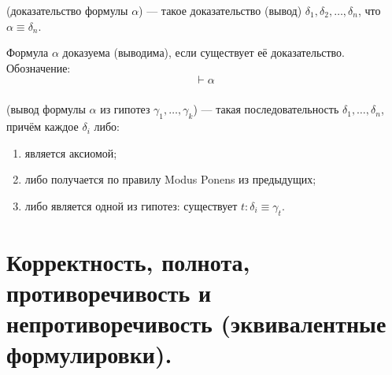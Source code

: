 \documentclass[10pt,a4paper,oneside]{article}
\begin{document}
(доказательство формулы $\alpha$)
--- такое доказательство (вывод) $\delta_1, \delta_2, \dots, \delta_n$,
что $\alpha\equiv\delta_n$.

Формула $\alpha$ доказуема (выводима), если существует её доказательство. Обозначение:
$$\vdash \alpha$$

\subsubsection{}
(вывод формулы $\alpha$ из гипотез $\gamma_1,\dots,\gamma_k$)
    --- такая последовательность
    $\delta_1,\dots,\delta_n$, причём каждое $\delta_i$ либо:
    \begin{enumerate}
    \item является аксиомой;
    \item либо получается по правилу Modus Ponens из предыдущих;
    \item либо является одной из гипотез: существует $t: \delta_i \equiv \gamma_t$.
    \end{enumerate}


\section{Корректность, полнота, противоречивость и непротиворечивость (эквивалентные формулировки).}
\end{document}
